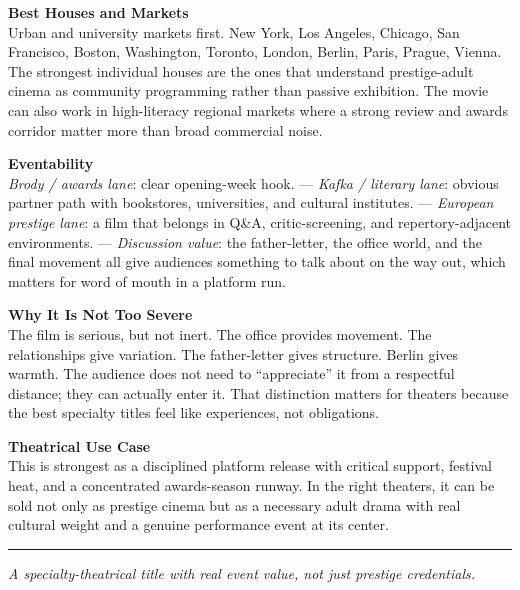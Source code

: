 \documentclass[11pt,letterpaper]{article}
\begin{document}
\textbf{Best Houses and Markets}\\
Urban and university markets first. New York, Los Angeles, Chicago, San Francisco, Boston, Washington, Toronto, London, Berlin, Paris, Prague, Vienna. The strongest individual houses are the ones that understand prestige-adult cinema as community programming rather than passive exhibition. The movie can also work in high-literacy regional markets where a strong review and awards corridor matter more than broad commercial noise.

\vspace{2pt}

\textbf{Eventability}\\
\textit{Brody / awards lane}: clear opening-week hook. --- \textit{Kafka / literary lane}: obvious partner path with bookstores, universities, and cultural institutes. --- \textit{European prestige lane}: a film that belongs in Q\&A, critic-screening, and repertory-adjacent environments. --- \textit{Discussion value}: the father-letter, the office world, and the final movement all give audiences something to talk about on the way out, which matters for word of mouth in a platform run.

\vspace{2pt}

\textbf{Why It Is Not Too Severe}\\
The film is serious, but not inert. The office provides movement. The relationships give variation. The father-letter gives structure. Berlin gives warmth. The audience does not need to ``appreciate'' it from a respectful distance; they can actually enter it. That distinction matters for theaters because the best specialty titles feel like experiences, not obligations.

\vspace{2pt}

\textbf{Theatrical Use Case}\\
This is strongest as a disciplined platform release with critical support, festival heat, and a concentrated awards-season runway. In the right theaters, it can be sold not only as prestige cinema but as a necessary adult drama with real cultural weight and a genuine performance event at its center.

\vspace{4pt}
\textcolor{sectionrule}{\rule{\textwidth}{0.5pt}}
\vspace{2pt}
\begin{center}
{\small\color{kafkalight}\textit{A specialty-theatrical title with real event value, not just prestige credentials.}}
\end{center}
\end{document}
